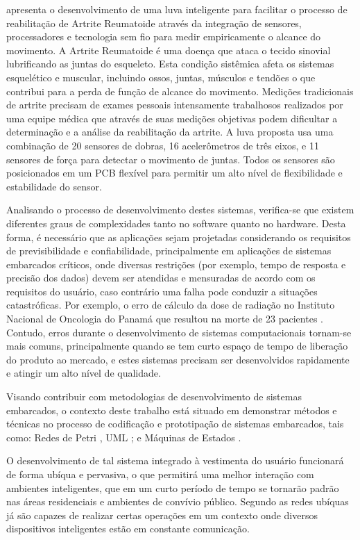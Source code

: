  apresenta o desenvolvimento de uma luva inteligente para facilitar o processo de reabilitação de Artrite Reumatoide através da integração de sensores, processadores e tecnologia sem fio para medir empiricamente o alcance do movimento. A Artrite Reumatoide é uma doença que ataca o tecido sinovial lubrificando as juntas do esqueleto. Esta condição sistêmica afeta os sistemas esquelético e muscular, incluindo ossos, juntas, músculos e tendões o que contribui para a perda de função de alcance do movimento. Medições tradicionais de artrite precisam de exames pessoais intensamente trabalhosos realizados por uma equipe médica que através de suas medições objetivas podem dificultar a determinação e a análise da reabilitação da artrite. A luva proposta \cite{OFLYNN:2013} usa uma combinação de 20 sensores de dobras, 16 acelerômetros de três eixos, e 11 sensores de força para detectar o movimento de juntas. Todos os sensores são posicionados em um PCB flexível para permitir um alto nível de flexibilidade e estabilidade do sensor.


Analisando o processo de desenvolvimento destes sistemas, verifica-se que existem diferentes graus de complexidades tanto no software quanto no hardware. Desta forma, é necessário que as aplicações sejam projetadas considerando os requisitos de previsibilidade e confiabilidade, principalmente em aplicações de sistemas embarcados críticos, onde diversas restrições (por exemplo, tempo de resposta e precisão dos dados) devem ser atendidas e mensuradas de acordo com os requisitos do usuário, caso contrário uma falha pode conduzir a situações catastróficas. Por exemplo, o erro de cálculo da dose de radiação no Instituto Nacional de Oncologia do Panamá que resultou na morte de 23 pacientes \cite{WONG:2010}. Contudo, erros durante o desenvolvimento de sistemas computacionais tornam-se mais comuns, principalmente quando se tem curto espaço de tempo de liberação do produto ao mercado, e estes sistemas precisam ser desenvolvidos rapidamente e atingir um alto nível de qualidade. 


Visando contribuir com metodologias de desenvolvimento de sistemas embarcados, o contexto deste trabalho está situado em demonstrar métodos e técnicas no processo de codificação e prototipação de sistemas embarcados, tais como: Redes de Petri \cite{BENDERS:1992} \cite{VALK:2002}, UML \cite{ROCHA:2011}; e Máquinas de Estados \cite{LAMPKA:2009}. 


O desenvolvimento de tal sistema integrado à vestimenta do usuário funcionará de forma ubíqua e pervasiva, o que permitirá uma melhor interação com ambientes inteligentes, que em um curto período de tempo se tornarão padrão nas áreas residenciais e ambientes de convívio público. Segundo  as redes ubíquas já são capazes de realizar certas operações em um contexto onde diversos dispositivos inteligentes estão em constante comunicação.  


